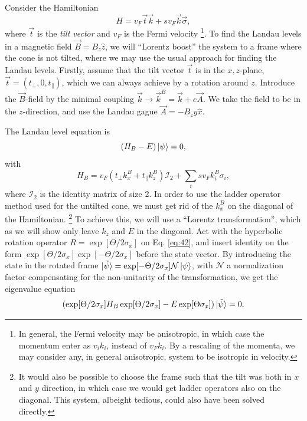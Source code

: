Consider the Hamiltonian
\begin{equation}
  \label{eq:40}
  H = v_{F} \vec{t} \vec{k} + s v_{F} \vec{k} \vec{\sigma},
\end{equation}
where \(\vec{t}\) is the \emph{tilt vector} and \( v_F \) is the Fermi velocity
\footnote{In general, the Fermi velocity may be anisotropic, in which case the momentum enter as \( v_i k_i \), instead of \( v_F k_i \). By a rescaling of the momenta, we may consider any, in general anisotropic, system to be isotropic in velocity.}.
To find the Landau levels in a magnetic field \(\vec{B} = B_{z}\hat{z} \), we will ``Lorentz boost'' the system to a frame where the cone is not tilted, where we may use the usual approach for finding the Landau levels.
Firstly, assume that the tilt vector \(\vec{ t }\) is in the \(x,z\)-plane, \(\vec{t} = (t_{\perp}, 0, t_{\parallel})\), which we can always achieve by a rotation around \(z\).
Introduce the \(\vec{B}\)-field by the minimal coupling \(\vec{k} \to \vec{k}^B = \vec{k} + e \vec{A}\).
We take the field to be in the \( z \)-direction, and use the Landau gague \(\vec{A} = -B_{z}y \hat{x}\).

The Landau level equation is
\begin{equation}
  \label{eq:42}
  \left(H_{B} - E\right) \ket{\psi } = 0,
\end{equation}
with
\begin{equation}
  \label{eq:44}
  H_{B} = v_F \left(t _{\perp} k^B_{x} + t _{\parallel} k^B_{z} \right) \mathcal{I}_2 + \sum_i s v_{F} k^B_{i} \sigma _{i},
\end{equation}
where \(\mathcal{I}_{2}\) is the identity matrix of size 2.
In order to use the ladder operator method used for the untilted cone, we must get rid of the \(k^B_{x}\) on the diagonal of the Hamiltonian.
\footnote{It would also be possible to choose the frame such that the tilt was both in \(x\) and \(y\) direction, in which case we would get ladder operators also on the diagonal.
  This system, albeight tedious, could also have been solved directly.
}
To achieve this, we will use a ``Lorentz transformation'', which as we will show only leave \(k_{z}\) and \(E\) in the diagonal.
Act with the hyperbolic rotation operator \(R = \exp[\Theta /2 \sigma_{x}]\) on Eq. \eqref{eq:42}, and insert identity on the form \(\exp[\Theta /2 \sigma_{x}]\exp[-\Theta /2 \sigma_{x}]\) before the state vector.
By introducing the state in the rotated frame \(\ket{\tilde{\psi}} = \exp[- \Theta /2 \sigma_{x}] \mathcal{N} \ket{\psi } \), with \(\mathcal{N}\) a normalization factor compensating for the non-unitarity of the transformation, we get the eigenvalue equation
\begin{equation}
  \label{eq:43}
  (\exp[\Theta /2 \sigma_{x}] H_{B}\exp[\Theta /2 \sigma_{x}] - E \exp[\Theta \sigma_{x}]) \ket{\tilde{\psi}} = 0.
\end{equation}

